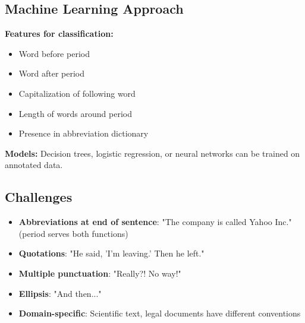 \documentclass[11pt,a4paper]{article}
\theoremstyle{definition}
\theoremstyle{plain}
\theoremstyle{remark}
\begin{document}
\subsection{Machine Learning Approach}

\textbf{Features for classification:}
\begin{itemize}
    \item Word before period
    \item Word after period
    \item Capitalization of following word
    \item Length of words around period
    \item Presence in abbreviation dictionary
\end{itemize}

\textbf{Models:} Decision trees, logistic regression, or neural networks can be trained on annotated data.

\subsection{Challenges}

\begin{itemize}
    \item \textbf{Abbreviations at end of sentence}: "The company is called Yahoo Inc." (period serves both functions)
    \item \textbf{Quotations}: "He said, 'I'm leaving.' Then he left."
    \item \textbf{Multiple punctuation}: "Really?! No way!"
    \item \textbf{Ellipsis}: "And then..."
    \item \textbf{Domain-specific}: Scientific text, legal documents have different conventions
\end{itemize}
\end{document}
